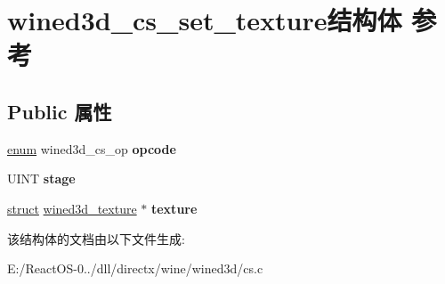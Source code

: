 \hypertarget{structwined3d__cs__set__texture}{}\section{wined3d\+\_\+cs\+\_\+set\+\_\+texture结构体 参考}
\label{structwined3d__cs__set__texture}
\subsection*{Public 属性}
\begin{DoxyCompactItemize}
\item 
\mbox{\label{structwined3d__cs__set__texture_abf5ef26c3b1ea09252a3dd3560f51e44}} 
\hyperlink{interfaceenum}{enum} wined3d\+\_\+cs\+\_\+op {\bfseries opcode}
\item 
\mbox{\label{structwined3d__cs__set__texture_aa183e5ff3cabf8ad2925f0545106a2d2}} 
U\+I\+NT {\bfseries stage}
\item 
\mbox{\label{structwined3d__cs__set__texture_aa2d6a26327bcb18e1f173881e032df97}} 
\hyperlink{interfacestruct}{struct} \hyperlink{structwined3d__texture}{wined3d\+\_\+texture} $\ast$ {\bfseries texture}
\end{DoxyCompactItemize}


该结构体的文档由以下文件生成\+:\begin{DoxyCompactItemize}
\item 
E\+:/\+React\+O\+S-\/0../dll/directx/wine/wined3d/cs.\+c\end{DoxyCompactItemize}
